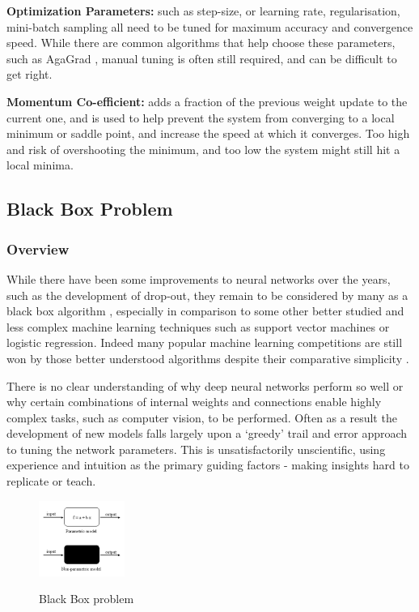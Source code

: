 \documentclass[a4paper,11pt,titlepage]{article}
\begin{document}
		\par 
		\textbf{Optimization Parameters:} such as step-size, or learning rate, regularisation, mini-batch sampling all need to be tuned for maximum accuracy and convergence speed. While there are common algorithms that help choose these parameters, such as AgaGrad \cite{Duchi2011}, manual tuning is often still required, and can be difficult to get right.
		\par
		\textbf{Momentum Co-efficient:} adds a fraction of the previous weight update to the current one, and is used to help prevent the system from converging to a local minimum or saddle point, and increase the speed at which it converges. Too high and risk of overshooting the minimum, and too low the system might still hit a local minima.
	\subsection{Black Box Problem}
		\subsubsection{Overview}
		While there have been some improvements to neural networks over the years, such as the development of drop-out, they remain to be considered by many as a black box algorithm \cite{Bernd1999}, especially in comparison to some other better studied and less complex machine learning techniques such as support vector machines or logistic regression. Indeed many popular machine learning competitions are still won by those better understood algorithms despite their comparative simplicity \cite{Adams2015}.
		\par 
		There is no clear understanding of why deep neural networks perform so well or why certain combinations of internal weights and connections enable highly complex tasks, such as computer vision, to be performed. Often as a result the development of new models falls largely upon a `greedy' trail and error approach to tuning the network parameters. This is unsatisfactorily unscientific, using experience and intuition as the primary guiding factors - making insights hard to replicate or teach.
		\par
		
		\begin{figure}[H]
    			\centering	
			{{\includegraphics[width=0.25\textwidth]
    				{img/black_box.png} 
    			}}%
    			\caption{Black Box problem}%
    			\label{fig:BlackBox}
		\end{figure}	 
\end{document}
